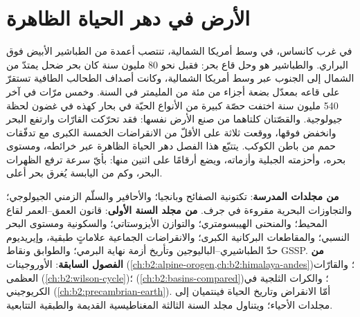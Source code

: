 \chapter{الأرض في دهر الحياة الظاهرة}\label{ch:b2:phanerozoic-earth}

في غرب كانساس، في وسط أمريكا الشمالية، تنتصب أعمدة من الطباشير الأبيض فوق
البراري. والطباشير هو وحل قاع بحر: فقبل نحو 80 مليون سنة كان بحر
ضحل يمتدّ من الشمال إلى الجنوب عبر وسط أمريكا الشمالية، وكانت أصداف
الطحالب الطافية تستقرّ على قاعه بمعدّل بضعة أجزاء من مئة من المليمتر في السنة. وخمس مرّات في
آخر 540 مليون سنة اختفت حصّة كبيرة من الأنواع الحيّة في بحار كهذه في غضون
لحظة جيولوجية. والقصّتان كلتاهما من صنع الأرض نفسها: فقد تحرّكت القارّات وارتفع البحر وانخفض فوقها،
ووقعت ثلاثة على الأقلّ من الانقراضات الخمسة الكبرى مع تدفّقات حمم من باطن
الكوكب. يتتبّع هذا الفصل دهر الحياة الظاهرة عبر خرائطه، ومستوى بحره، وأحزمته
الجبلية وأزماته، ويضع أرقامًا على اثنين منها: بأيّ سرعة ترفع الظهرات البحر، وكم من
اليابسة يُغرق بحر أعلى.

\begin{recall}
\textbf{من مجلدات المدرسة}: تكتونية الصفائح وبانجيا؛ والأحافير والسلّم الزمني
الجيولوجي؛ والتجاوزات البحرية مقروءة في جرف. \textbf{من مجلد السنة الأولى}: قانون العمق--العمر
لقاع المحيط؛ والمنحنى الهيبسومتري؛ والتوازن الأيزوستاتي؛ والسكونية ومستوى البحر النسبي؛ والمقاطعات
البركانية الكبرى؛ والانقراضات الجماعية علاماتٍ طبقية، وإيريديوم حدّ الطباشيري--الباليوجين
وتأريخ أزمة نهاية البرمي؛ والطوابق ونقاط GSSP. \textbf{من الفصول السابقة}: الأوروجينات
(\cref{ch:b2:alpine-orogen,ch:b2:himalaya-andes})؛  والقارّات العظمى
(\cref{ch:b2:wilson-cycle})؛  (\cref{ch:b2:basins-compared})؛ والكرات الثلجية في
الكريوجيني (\cref{ch:b2:precambrian-earth}). أمّا الانقراض وتاريخ الحياة فينتميان إلى مجلدات
الأحياء؛ ويتناول مجلد السنة الثالثة المغناطيسية القديمة والطبقية التتابعية.
\end{recall}

